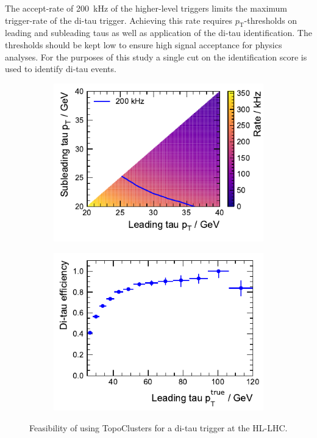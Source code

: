 The accept-rate of \SI{200}{\kilo\hertz} of the higher-level triggers limits the
maximum trigger-rate of the di-tau trigger. Achieving this rate requires
$p_\text{T}$-thresholds on leading and subleading taus as well as application of
the di-tau identification. The thresholds should be kept low to ensure high
signal acceptance for physics analyses. For the purposes of this study a single
cut on the identification score is used to identify di-tau events.

\begin{figure}[htb]
  \centering
  \begin{subfigure}[t]{0.48\textwidth}
    \centering
    \includegraphics{./figures/rnn/trigger/pt_rate_reg.pdf}
    \label{fig:rate_vs_thresholds}
  \end{subfigure}\hfill
  \begin{subfigure}[t]{0.48\textwidth}
    \centering
    \includegraphics{./figures/rnn/trigger/taueff_reg.pdf}
    \label{fig:ditau_trigger_eff}
  \end{subfigure}
  \caption{Feasibility of using TopoClusters for a di-tau trigger at the
    HL-LHC.}
  \label{fig:rnn_ditau_trigger}
\end{figure}

